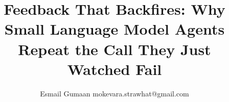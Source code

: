 \documentclass{article}
\title{Feedback That Backfires: Why Small Language Model Agents Repeat
the Call They Just Watched Fail}
\author{\name Esmail Gumaan \email mokevara.strawhat@gmail.com}
\begin{document}
\maketitle

\begin{abstract}

\end{abstract}

















\appendix

\end{document}
